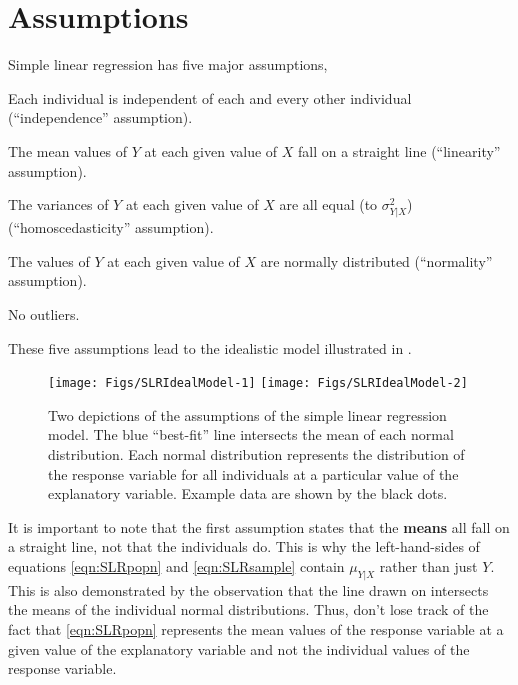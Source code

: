 \documentclass[10pt,openany]{book}\usepackage[]{graphicx}\usepackage[]{color}
\newenvironment{knitrout}{}{} %
\begin{document}
\section{Assumptions} \label{sect:SLRAssumptions}
Simple linear regression has five major assumptions,
\begin{Enumerate}
  \item Each individual is independent of each and every other individual (``independence'' assumption).
  \item The mean values of $Y$ at each given value of $X$ fall on a straight line (``linearity'' assumption).
  \item The variances of $Y$ at each given value of $X$ are all equal (to $\sigma^{2}_{Y|X}$) (``homoscedasticity'' assumption).
  \item The values of $Y$ at each given value of $X$ are normally distributed (``normality'' assumption).
  \item No outliers.
\end{Enumerate}
These five assumptions lead to the idealistic model illustrated in .



\begin{knitrout}
\color{fgcolor}\begin{figure}[h]

{\centering \texttt{[image: Figs/SLRIdealModel-1]} 
\texttt{[image: Figs/SLRIdealModel-2]} 

}

\caption[Two depictions of the assumptions of the simple linear regression model]{Two depictions of the assumptions of the simple linear regression model.  The blue ``best-fit'' line intersects the mean of each normal distribution.  Each normal distribution represents the distribution of the response variable for all individuals at a particular value of the explanatory variable.  Example data are shown by the black dots.}\label{fig:SLRIdealModel}
\end{figure}


\end{knitrout}
\vspace{9pt}
It is important to note that the first assumption states that the \textbf{means} all fall on a straight line, not that the individuals do.  This is why the left-hand-sides of equations \eqref{eqn:SLRpopn} and \eqref{eqn:SLRsample} contain $\mu_{Y|X}$ rather than just $Y$.  This is also demonstrated by the observation that the line drawn on  intersects the means of the individual normal distributions.  Thus, don't lose track of the fact that \eqref{eqn:SLRpopn} represents the mean values of the response variable at a given value of the explanatory variable and not the individual values of the response variable.
\end{document}
